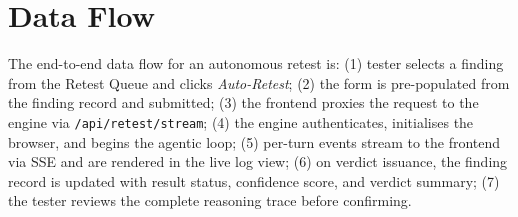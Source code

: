 \section{Data Flow}

The end-to-end data flow for an autonomous retest is: (1) tester selects a finding from the Retest Queue and clicks \textit{Auto-Retest}; (2) the form is pre-populated from the finding record and submitted; (3) the frontend proxies the request to the engine via \texttt{/api/retest/stream}; (4) the engine authenticates, initialises the browser, and begins the agentic loop; (5) per-turn events stream to the frontend via SSE and are rendered in the live log view; (6) on verdict issuance, the finding record is updated with result status, confidence score, and verdict summary; (7) the tester reviews the complete reasoning trace before confirming.
